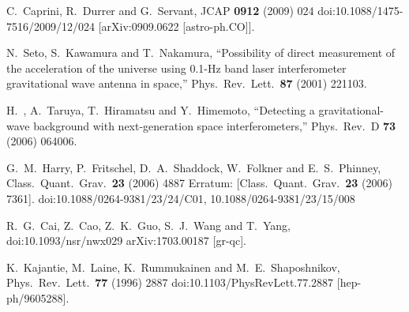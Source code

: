\documentclass[12pt]{article}
\begin{document}
\begin{thebibliography}{99}
  C.~Caprini, R.~Durrer and G.~Servant,
  JCAP {\bf 0912} (2009) 024
  doi:10.1088/1475-7516/2009/12/024
  [arXiv:0909.0622 [astro-ph.CO]].
  
  N.~Seto, S.~Kawamura and T.~Nakamura,
  ``Possibility of direct measurement of the acceleration of the universe using 0.1-Hz band laser interferometer gravitational wave antenna in space,''
  Phys.\ Rev.\ Lett.\  {\bf 87} (2001) 221103.
  
  H.~, A.~Taruya, T.~Hiramatsu and Y.~Himemoto,
  ``Detecting a gravitational-wave background with next-generation space interferometers,''
  Phys.\ Rev.\ D {\bf 73} (2006) 064006.
  

  G.~M.~Harry, P.~Fritschel, D.~A.~Shaddock, W.~Folkner and E.~S.~Phinney,
  Class.\ Quant.\ Grav.\  {\bf 23} (2006) 4887
   Erratum: [Class.\ Quant.\ Grav.\  {\bf 23} (2006) 7361].
  doi:10.1088/0264-9381/23/24/C01, 10.1088/0264-9381/23/15/008

  R.~G.~Cai, Z.~Cao, Z.~K.~Guo, S.~J.~Wang and T.~Yang,
  doi:10.1093/nsr/nwx029
  arXiv:1703.00187 [gr-qc].
  
   

  K.~Kajantie, M.~Laine, K.~Rummukainen and M.~E.~Shaposhnikov,
  Phys.\ Rev.\ Lett.\  {\bf 77} (1996) 2887
  doi:10.1103/PhysRevLett.77.2887
  [hep-ph/9605288].



\end{thebibliography}
\end{document}
